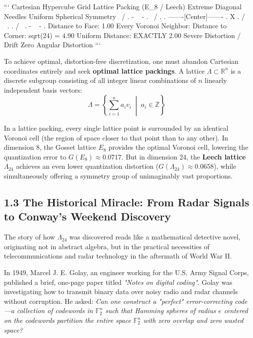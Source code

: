 \documentclass[11pt,twoside,openright]{amsbook}
\begin{document}
```
       Cartesian Hypercube Grid                  Lattice Packing (E_8 / Leech)
       Extreme Diagonal Needles                     Uniform Spherical Symmetry
              \       /                                     . - ~ - .
               \     /                                  .               .
         -------[Center]-------                       .         X         .
               /     \                                  .               .
              /       \                                     . - ~ - .
       Distance to Face: 1.00                      Every Voronoi Neighbor:
       Distance to Corner: sqrt(24) = 4.90         Uniform Distance: EXACTLY 2.00
       Severe Distortion / Drift                   Zero Angular Distortion
```

To achieve optimal, distortion-free discretization, one must abandon Cartesian coordinates entirely and seek \textbf{optimal lattice packings}. A lattice $\Lambda \subset \mathbb{R}^n$ is a discrete subgroup consisting of all integer linear combinations of $n$ linearly independent basis vectors:
$$\Lambda = \left\{ \sum_{i=1}^n a_i v_i \;\middle|\; a_i \in \mathbb{Z} \right\}$$

In a lattice packing, every single lattice point is surrounded by an identical Voronoi cell (the region of space closer to that point than to any other). In dimension 8, the Gosset lattice $E_8$ provides the optimal Voronoi cell, lowering the quantization error to $G(E_8) \approx 0.0717$. But in dimension 24, the \textbf{Leech lattice $\Lambda_{24}$} achieves an even lower quantization distortion ($G(\Lambda_{24}) \approx 0.0658$), while simultaneously offering a symmetry group of unimaginably vast proportions.

\subsection{1.3 The Historical Miracle: From Radar Signals to Conway's Weekend Discovery}

The story of how $\Lambda_{24}$ was discovered reads like a mathematical detective novel, originating not in abstract algebra, but in the practical necessities of telecommunications and radar technology in the aftermath of World War II.

In 1949, Marcel J. E. Golay, an engineer working for the U.S. Army Signal Corps, published a brief, one-page paper titled \textit{"Notes on digital coding"}. Golay was investigating how to transmit binary data over noisy radio and radar channels without corruption. He asked: \textit{Can one construct a "perfect" error-correcting code—a collection of codewords in $\mathbb{F}_2^n$ such that Hamming spheres of radius $e$ centered on the codewords partition the entire space $\mathbb{F}_2^n$ with zero overlap and zero wasted space?}
\end{document}
